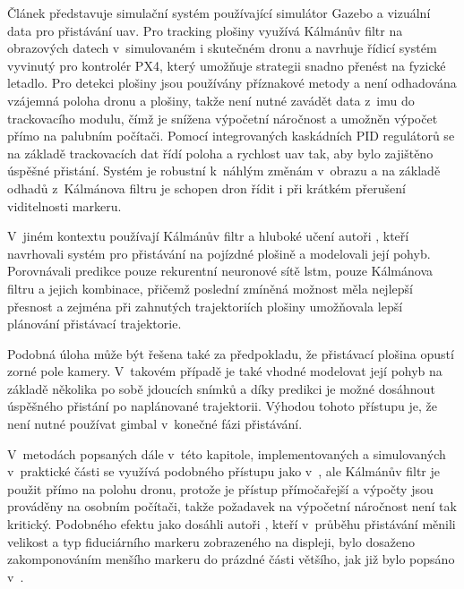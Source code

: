     Článek \cite{Saavedra2021} představuje simulační systém používající simulátor Gazebo a vizuální data pro přistávání \acrshort{uav}. Pro tracking plošiny využívá Kálmánův filtr na obrazových datech v~simulovaném i skutečném dronu a navrhuje řídicí systém vyvinutý pro kontrolér PX4, který umožňuje strategii snadno přenést na fyzické letadlo. Pro detekci plošiny jsou používány příznakové metody a není odhadována vzájemná poloha dronu a plošiny, takže není nutné zavádět data z~\acrshort{imu} do trackovacího modulu, čímž je snížena výpočetní náročnost a umožněn výpočet přímo na palubním počítači. Pomocí integrovaných kaskádních PID regulátorů se na základě trackovacích dat řídí poloha a rychlost \acrshort{uav} tak, aby bylo zajištěno úspěšné přistání. Systém je robustní k~náhlým změnám v~obrazu a na základě odhadů z~Kálmánova filtru je schopen dron řídit i při krátkém přerušení viditelnosti markeru.

    V~jiném kontextu používají Kálmánův filtr a hluboké učení autoři \cite{Luo2022}, kteří navrhovali systém pro přistávání na pojízdné plošině a modelovali její pohyb. Porovnávali predikce pouze rekurentní neuronové sítě \acrshort{lstm}, pouze Kálmánova filtru a jejich kombinace, přičemž poslední zmíněná možnost měla nejlepší přesnost a zejména při zahnutých trajektoriích plošiny umožňovala lepší plánování přistávací trajektorie.

    Podobná úloha může být řešena také za předpokladu, že přistávací plošina opustí zorné pole kamery. V~takovém případě je také vhodné modelovat její pohyb na základě několika po sobě jdoucích snímků a díky predikci je možné dosáhnout úspěšného přistání po naplánované trajektorii. Výhodou tohoto přístupu je, že není nutné používat gimbal v~konečné fázi přistávání. \cite{Acuna2018}

    V~metodách popsaných dále v~této kapitole, implementovaných a simulovaných v~praktické části se využívá podobného přístupu jako v~\cite{Saavedra2021}, ale Kálmánův filtr je použit přímo na polohu dronu, protože je přístup přímočařejší a výpočty jsou prováděny na osobním počítači, takže požadavek na výpočetní náročnost není tak kritický. Podobného efektu jako dosáhli autoři \cite{Acuna2017}, kteří v~průběhu přistávání měnili velikost a typ fiduciárního markeru zobrazeného na displeji, bylo dosaženo zakomponováním menšího markeru do prázdné části většího, jak již bylo popsáno v~.

